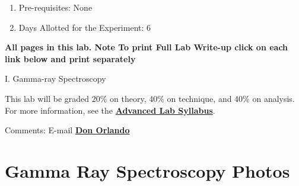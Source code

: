 \documentclass{../lab}
\begin{document}
\begin{enumerate}
    \item Pre-requisites: None

    \item Days Allotted for the Experiment: 6

\end{enumerate}

\textbf{All pages in this lab. Note To print Full Lab Write-up click on each link below and print separately}

I. Gamma-ray Spectroscopy

This lab will be graded 20\% on theory, 40\% on technique, and 40\% on analysis. For more information, see the \href{\AdvancedLabSyllabus}{\textbf{Advanced Lab Syllabus}}.

Comments: E-mail \href{\MailDonOrlando}{\textbf{Don Orlando}}

\section{Gamma Ray Spectroscopy Photos}
\end{document}
